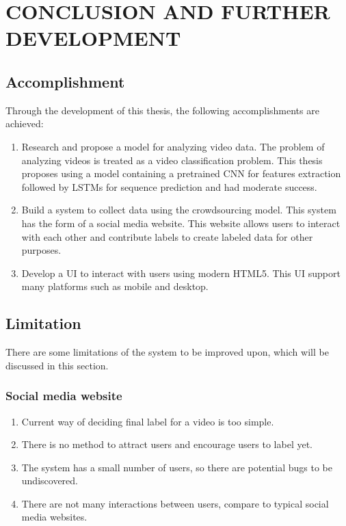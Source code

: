 \chapter{CONCLUSION AND FURTHER DEVELOPMENT}

\section{Accomplishment}
Through the development of this thesis, the following accomplishments are achieved:
\begin{enumerate}
    \item Research and propose a model for analyzing video data. The problem of analyzing videos is treated as a video classification problem. This thesis proposes using a model containing a pretrained CNN for features extraction followed by LSTMs for sequence prediction and had moderate success.
    \item Build a system to collect data using the crowdsourcing model. This system has the form of a social media website. This website allows users to interact with each other and contribute labels to create labeled data for other purposes.
    \item Develop a UI to interact with users using modern HTML5. This UI support many platforms such as mobile and desktop.
\end{enumerate}


\section{Limitation}
There are some limitations of the system to be improved upon, which will be discussed in this section.
\subsection{Social media website}
\begin{enumerate}

\item Current way of deciding final label for a video is too simple.
\item There is no method to attract users and encourage users to label yet.
\item The system has a small number of users, so there are potential bugs to be undiscovered.
\item There are not many interactions between users, compare to typical social media websites. 
 
\end{enumerate}
